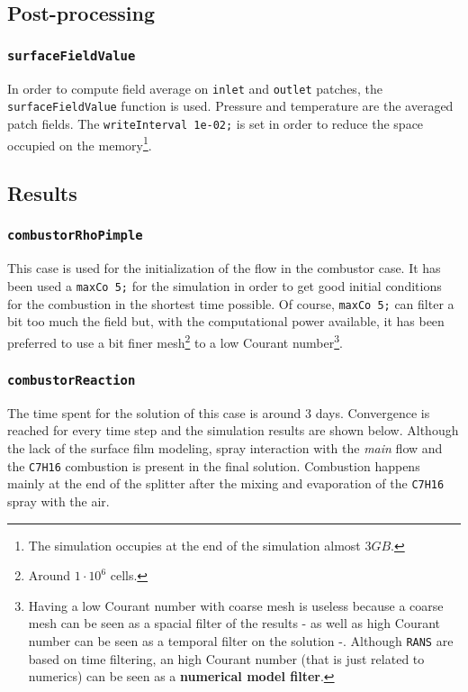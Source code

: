     \subsection{Post-processing}
    \cprotect\subsubsection{\verb|surfaceFieldValue|}
    In order to compute field average on \verb|inlet| and \verb|outlet| patches, the \verb|surfaceFieldValue| function is used. Pressure and temperature are the averaged patch fields. The \verb|writeInterval 1e-02;| is set in order to reduce the space occupied on the memory\footnote{The simulation occupies at the end of the simulation almost $3GB$.}. 

    \subsection{Results}
        \cprotect\subsubsection{\verb|combustorRhoPimple|}
        This case is used for the initialization of the flow in the combustor case. It has been used a \verb|maxCo 5;| for the simulation in order to get good initial conditions for the combustion in the shortest time possible. Of course, \verb|maxCo 5;| can filter a bit too much the field but, with the computational power available, it has been preferred to use a bit finer mesh\footnote{Around $1 \cdot 10^6$ cells.} to a low Courant number\cprotect\footnote{Having a low Courant number with coarse mesh is useless because a coarse mesh can be seen as a spacial filter of the results - as well as high Courant number can be seen as a temporal filter on the solution -. Although \verb|RANS| are based on time filtering, an high Courant number (that is just related to numerics) can be seen as a \textbf{numerical model filter}.}.
        
        \cprotect\subsubsection{\verb|combustorReaction|}
        The time spent for the solution of this case is around $3$ days. Convergence is reached for every time step and the simulation results are shown below. Although the lack of the surface film modeling, spray interaction with the \textit{main} flow and the \verb|C7H16| combustion is present in the final solution. Combustion happens mainly at the end of the splitter after the mixing and evaporation of the \verb|C7H16| spray with the air.    

